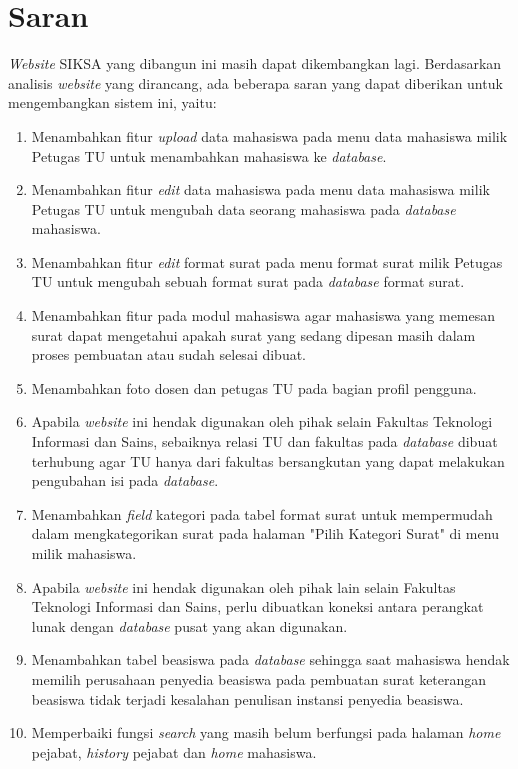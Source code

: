 \section{Saran}
\label{sec:saran}
\textit{Website} SIKSA yang dibangun ini masih dapat dikembangkan lagi. Berdasarkan analisis \textit{website} yang dirancang, ada beberapa saran yang dapat diberikan untuk mengembangkan sistem ini, yaitu:
\begin{enumerate}
	\item Menambahkan fitur \textit{upload} data mahasiswa pada menu data mahasiswa milik Petugas TU untuk menambahkan mahasiswa ke \textit{database}.
	\item Menambahkan fitur \textit{edit} data mahasiswa pada menu data mahasiswa milik Petugas TU untuk mengubah data seorang mahasiswa pada \textit{database} mahasiswa.
	\item Menambahkan fitur \textit{edit} format surat pada menu format surat milik Petugas TU untuk mengubah sebuah format surat pada \textit{database} format surat.
	\item Menambahkan fitur pada modul mahasiswa agar mahasiswa yang memesan surat dapat mengetahui apakah surat yang sedang dipesan masih dalam proses pembuatan atau sudah selesai dibuat.
	\item Menambahkan foto dosen dan petugas TU pada bagian profil pengguna.
	\item Apabila \textit{website} ini hendak digunakan oleh pihak selain Fakultas Teknologi Informasi dan Sains, sebaiknya relasi TU dan fakultas pada \textit{database} dibuat terhubung agar TU hanya dari fakultas bersangkutan yang dapat melakukan pengubahan isi pada \textit{database}.
	\item Menambahkan \textit{field} kategori pada tabel format surat untuk mempermudah dalam mengkategorikan surat pada halaman "Pilih Kategori Surat" di menu milik mahasiswa.
	\item Apabila \textit{website} ini hendak digunakan oleh pihak lain selain Fakultas Teknologi Informasi dan Sains, perlu dibuatkan koneksi antara perangkat lunak dengan \textit{database} pusat yang akan digunakan.
	\item Menambahkan tabel beasiswa pada \textit{database} sehingga saat mahasiswa hendak memilih perusahaan penyedia beasiswa pada pembuatan surat keterangan beasiswa tidak terjadi kesalahan penulisan instansi penyedia beasiswa.
	\item Memperbaiki fungsi \textit{search} yang masih belum berfungsi pada halaman \textit{home} pejabat, \textit{history} pejabat dan \textit{home} mahasiswa.  
\end{enumerate}